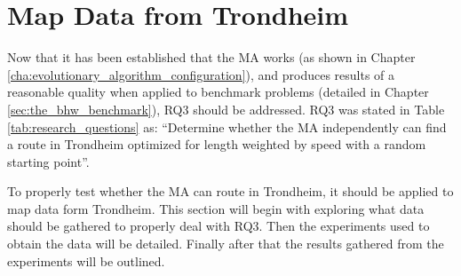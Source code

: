 {
\begin{table}[tbph]
\centering
{} %
\caption{The best result obtained from the MA and the known optimal solution for the BHW1 benchmark.}
\label{tab:BHW1_solutions_compared}
\end{table}
}

\section{Map Data from Trondheim}
\label{sec:map_data_from_trondheim}

Now that it has been established that the MA works (as shown in Chapter \ref{cha:evolutionary_algorithm_configuration}), and produces results of a reasonable quality when applied to benchmark problems (detailed in Chapter \ref{sec:the_bhw_benchmark}), RQ3 should be addressed. RQ3 was stated in Table \ref{tab:research_questions} as: \enquote{Determine whether the MA independently can find a route in Trondheim optimized for length weighted by speed with a random starting point}.

To properly test whether the MA can route in Trondheim, it should be applied to map data form Trondheim. This section will begin with exploring what data should be gathered to properly deal with RQ3. Then the experiments used to obtain the data will be detailed. Finally after that the results gathered from the experiments will be outlined.

